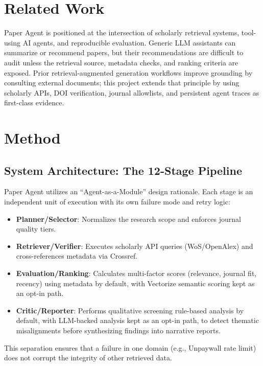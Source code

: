 \documentclass[10pt,twocolumn]{article}
\begin{document}
\section{Related Work}

Paper Agent is positioned at the intersection of scholarly retrieval systems, tool-using AI agents, and reproducible evaluation. Generic LLM assistants can summarize or recommend papers, but their recommendations are difficult to audit unless the retrieval source, metadata checks, and ranking criteria are exposed. Prior retrieval-augmented generation workflows improve grounding by consulting external documents; this project extends that principle by using scholarly APIs, DOI verification, journal allowlists, and persistent agent traces as first-class evidence.

\section{Method}

\subsection{System Architecture: The 12-Stage Pipeline}

Paper Agent utilizes an ``Agent-as-a-Module'' design rationale. Each stage is an independent unit of execution with its own failure mode and retry logic:

\begin{itemize}
    \item \textbf{Planner/Selector}: Normalizes the research scope and enforces journal quality tiers.
    \item \textbf{Retriever/Verifier}: Executes scholarly API queries (WoS/OpenAlex) and cross-references metadata via Crossref.
    \item \textbf{Evaluation/Ranking}: Calculates multi-factor scores (relevance, journal fit, recency) using metadata by default, with Vectorize semantic scoring kept as an opt-in path.
    \item \textbf{Critic/Reporter}: Performs qualitative screening rule-based analysis by default, with LLM-backed analysis kept as an opt-in path, to detect thematic misalignments before synthesizing findings into narrative reports.
\end{itemize}

This separation ensures that a failure in one domain (e.g., Unpaywall rate limit) does not corrupt the integrity of other retrieved data.
\end{document}
